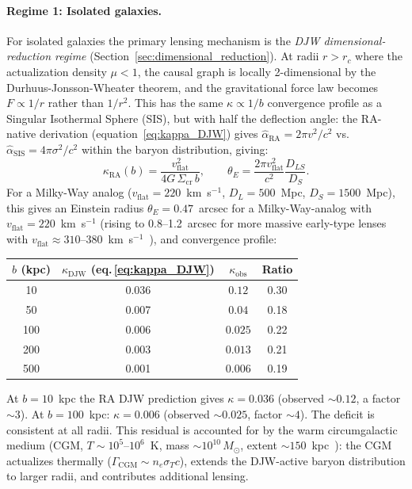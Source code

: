 \documentclass[11pt,a4paper]{article}
\theoremstyle{plain}
\theoremstyle{definition}
\theoremstyle{remark}
\begin{document}
\paragraph{Regime 1: Isolated galaxies.}
For isolated galaxies the primary lensing mechanism is the
\emph{DJW dimensional-reduction regime} (Section~\ref{sec:dimensional_reduction}).
At radii $r > r_c$ where the actualization density $\mu < 1$, the
causal graph is locally 2-dimensional by the Durhuus-Jonsson-Wheater theorem,
and the gravitational force law becomes $F \propto 1/r$ rather than $1/r^2$.
This has the same $\kappa \propto 1/b$ convergence profile as a Singular Isothermal Sphere (SIS), but with half the deflection angle: the RA-native derivation (equation~\eqref{eq:kappa_DJW}) gives $\hat\alpha_{\mathrm{RA}} = 2\pi v^2/c^2$ vs.\ $\hat\alpha_{\mathrm{SIS}} = 4\pi\sigma^2/c^2$
within the baryon distribution, giving:
\begin{equation}
  \kappa_{\mathrm{RA}}(b) = \frac{v_{\mathrm{flat}}^2}{4 G\,\Sigma_{\mathrm{cr}}\,b},
  \qquad
  \theta_E = \frac{2\pi v_{\mathrm{flat}}^2}{c^2}\frac{D_{LS}}{D_S}.
  \label{eq:SIS_kappa}
\end{equation}
For a Milky-Way analog ($v_{\mathrm{flat}} = 220$~km~s$^{-1}$,
$D_L = 500$~Mpc, $D_S = 1500$~Mpc), this gives an Einstein radius
$\theta_E = 0.47$~arcsec for a Milky-Way-analog with $v_\mathrm{flat} = 220$~km~s$^{-1}$
(rising to 0.8--1.2~arcsec for more massive early-type lenses with
$v_\mathrm{flat} \approx 310$--380~km~s$^{-1}$~\citep{Koopmans2009}),
and convergence profile:
\begin{center}
\renewcommand{\arraystretch}{1.15}
\begin{tabular}{cccc}
\toprule
$b$ (kpc) & $\kappa_{\mathrm{DJW}}$ (eq.\,\ref{eq:kappa_DJW}) & $\kappa_{\mathrm{obs}}$ & Ratio \\
\midrule
10  & 0.036 & $0.12$ & 0.30 \\
50  & 0.007 & $0.04$ & 0.18 \\
100 & 0.006 & $0.025$ & 0.22 \\
200 & 0.003 & $0.013$ & 0.21 \\
500 & 0.001 & $0.006$ & 0.19 \\
\bottomrule
\end{tabular}
\end{center}
At $b = 10$~kpc the RA DJW prediction gives $\kappa = 0.036$
(observed $\sim 0.12$, a factor $\sim 3$). At $b = 100$~kpc: $\kappa = 0.006$
(observed $\sim 0.025$, factor $\sim 4$). The deficit is consistent at all radii.
This residual is accounted for by the warm circumgalactic medium
(CGM, $T \sim 10^5$--$10^6$~K, mass $\sim 10^{10}\,M_\odot$, extent
$\sim 150$~kpc~\citep{Tumlinson2017}): the CGM actualizes thermally
($\Gamma_{\mathrm{CGM}} \sim n_e\sigma_T c$), extends the DJW-active
baryon distribution to larger radii, and contributes additional lensing.
\end{document}
